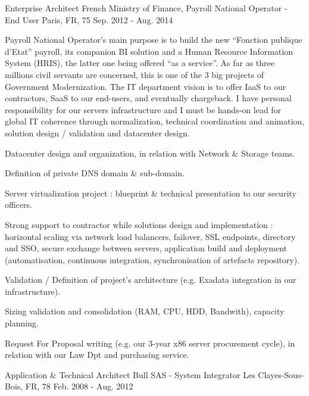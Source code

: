 \begin{cventries}
  \cventry
    {Enterprise Architect} %
    {French Ministry of Finance, Payroll National Operator - End User} %
    {Paris, FR, 75} %
    {Sep. 2012 - Aug. 2014} %
    {
Payroll National Operator’s main purpose is to build the new “Fonction publique d’Etat” payroll, its companion BI solution and a Human Resource Information System (HRIS), the latter one being offered “as a service”. As far as three millions civil servants are concerned, this is one of the 3 big projects of Government Modernization.
\cvparagraph
The IT department vision is to offer IaaS to our contractors, SaaS to our end-users, and eventually chargeback.
I have personal responsibility for our servers infrastructure and I must be hands-on lead for global IT coherence through normalization, technical coordination and animation, solution design / validation and datacenter design.
\cvparagraph
\newline
      \begin{cvitems} %
        \item {Datacenter design and organization, in relation with Network \& Storage teams.}
        \item {Definition of private DNS domain \& sub-domain.}
        \item {Server virtualization project : blueprint \& technical presentation to our security officers.}
        \item {Strong support to contractor while solutions design and implementation : horizontal scaling via network load balancers, failover, SSL endpoints, directory and SSO, secure exchange between servers, application build and deployment (automatisation, continuous integration, synchronisation of artefacts repository).}
        \item {Validation / Definition of project’s architecture (e.g. Exadata integration in our infrastructure).}
        \item {Sizing validation and consolidation (RAM, CPU, HDD, Bandwith), capacity planning.}
        \item {Request For Proposal writing (e.g. our 3-year x86 server procurement cycle), in relation with our Law Dpt and purchasing service.}
      \end{cvitems}
    }

  \cventry
    {Application \& Technical Architect} %
    {Bull SAS - System Integrator} %
    {Les Clayes-Sous-Bois, FR, 78} %
    {Feb. 2008 - Aug. 2012} %
    {
      \begin{cvitems} %
        \item {}
      \end{cvitems}
    }


\end{cventries}
